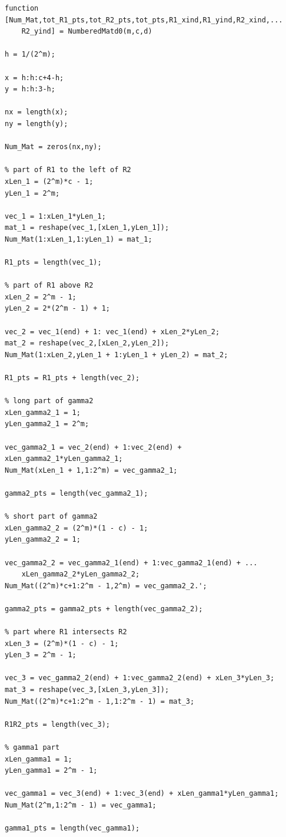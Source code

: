 \documentclass[12pt]{article}
\begin{document}
\lstset{language=matlab,frame=single}
\begin{lstlisting}[caption=Enumeration for b equals 0]
function [Num_Mat,tot_R1_pts,tot_R2_pts,tot_pts,R1_xind,R1_yind,R2_xind,...
    R2_yind] = NumberedMatd0(m,c,d)

h = 1/(2^m);

x = h:h:c+4-h;
y = h:h:3-h;

nx = length(x);
ny = length(y);

Num_Mat = zeros(nx,ny);

% part of R1 to the left of R2
xLen_1 = (2^m)*c - 1;
yLen_1 = 2^m;

vec_1 = 1:xLen_1*yLen_1;
mat_1 = reshape(vec_1,[xLen_1,yLen_1]);
Num_Mat(1:xLen_1,1:yLen_1) = mat_1;

R1_pts = length(vec_1);

% part of R1 above R2
xLen_2 = 2^m - 1;
yLen_2 = 2*(2^m - 1) + 1;

vec_2 = vec_1(end) + 1: vec_1(end) + xLen_2*yLen_2;
mat_2 = reshape(vec_2,[xLen_2,yLen_2]);
Num_Mat(1:xLen_2,yLen_1 + 1:yLen_1 + yLen_2) = mat_2;

R1_pts = R1_pts + length(vec_2);

% long part of gamma2
xLen_gamma2_1 = 1;
yLen_gamma2_1 = 2^m;

vec_gamma2_1 = vec_2(end) + 1:vec_2(end) + xLen_gamma2_1*yLen_gamma2_1;
Num_Mat(xLen_1 + 1,1:2^m) = vec_gamma2_1;

gamma2_pts = length(vec_gamma2_1);

% short part of gamma2
xLen_gamma2_2 = (2^m)*(1 - c) - 1;
yLen_gamma2_2 = 1;

vec_gamma2_2 = vec_gamma2_1(end) + 1:vec_gamma2_1(end) + ...
    xLen_gamma2_2*yLen_gamma2_2;
Num_Mat((2^m)*c+1:2^m - 1,2^m) = vec_gamma2_2.';

gamma2_pts = gamma2_pts + length(vec_gamma2_2);

% part where R1 intersects R2
xLen_3 = (2^m)*(1 - c) - 1;
yLen_3 = 2^m - 1;

vec_3 = vec_gamma2_2(end) + 1:vec_gamma2_2(end) + xLen_3*yLen_3;
mat_3 = reshape(vec_3,[xLen_3,yLen_3]);
Num_Mat((2^m)*c+1:2^m - 1,1:2^m - 1) = mat_3;

R1R2_pts = length(vec_3);

% gamma1 part
xLen_gamma1 = 1;
yLen_gamma1 = 2^m - 1;

vec_gamma1 = vec_3(end) + 1:vec_3(end) + xLen_gamma1*yLen_gamma1;
Num_Mat(2^m,1:2^m - 1) = vec_gamma1;

gamma1_pts = length(vec_gamma1);


\end{lstlisting}
\end{document}
